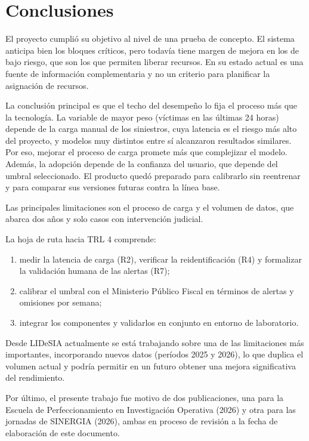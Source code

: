 \chapter{Conclusiones}\label{cap:conclusiones}

El proyecto cumplió su objetivo al nivel de una prueba de concepto. El sistema anticipa bien los bloques críticos, pero todavía tiene margen de mejora en los de bajo riesgo, que son los que permiten liberar recursos. En su estado actual es una fuente de información complementaria y no un criterio para planificar la asignación de recursos.

La conclusión principal es que el techo del desempeño lo fija el proceso más que la tecnología. La variable de mayor peso (víctimas en las últimas 24 horas) depende de la carga manual de los siniestros, cuya latencia es el riesgo más alto del proyecto, y modelos muy distintos entre sí alcanzaron resultados similares. Por eso, mejorar el proceso de carga promete más que complejizar el modelo. Además, la adopción depende de la confianza del usuario, que depende del umbral seleccionado. El producto quedó preparado para calibrarlo sin reentrenar y para comparar sus versiones futuras contra la línea base.

Las principales limitaciones son el proceso de carga y el volumen de datos, que abarca dos años y solo casos con intervención judicial.

La hoja de ruta hacia TRL 4 comprende:
\begin{enumerate}
    \item medir la latencia de carga (R2), verificar la reidentificación (R4) y formalizar la validación humana de las alertas (R7);
    \item calibrar el umbral con el Ministerio Público Fiscal en términos de alertas y omisiones por semana;
    \item integrar los componentes y validarlos en conjunto en entorno de laboratorio.
\end{enumerate}

Desde LIDeSIA actualmente se está trabajando sobre una de las limitaciones más importantes, incorporando nuevos datos (períodos 2025 y 2026), lo que duplica el volumen actual y podría permitir en un futuro obtener una mejora significativa del rendimiento.

Por último, el presente trabajo fue motivo de dos publicaciones, una para la Escuela de Perfeccionamiento en Investigación Operativa (2026) y otra para las jornadas de SINERGIA (2026), ambas en proceso de revisión a la fecha de elaboración de este documento.

